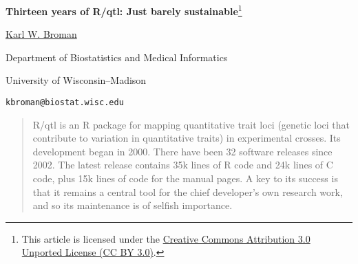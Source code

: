 \documentclass[letterpaper]{article}
\begin{document}
\renewcommand{\thefootnote}{\fnsymbol{footnote}}

\thispagestyle{empty}

\begin{center}
\large
\textbf{Thirteen years of R/qtl: Just barely
  sustainable}\footnote[0]{This article is licensed under the
  \href{http://creativecommons.org/licenses/by/3.0/}{Creative
    Commons Attribution 3.0 Unported License (CC BY 3.0)}.}

\bigskip


\href{http://www.biostat.wisc.edu/~kbroman}{Karl W. Broman}

Department of Biostatistics and Medical Informatics

University of Wisconsin--Madison

{\small \tt kbroman@biostat.wisc.edu}

\bigskip

\begin{quote}
R/qtl is an R package for mapping quantitative trait loci (genetic
loci that contribute to variation in quantitative traits) in
experimental crosses. Its development began in 2000.  There have been
32 software releases since 2002.  The latest release contains 35k lines
of R code and 24k lines of C code, plus 15k lines of code for the manual
pages.  A key to its success is
that it remains a central tool for the chief developer's own research
work, and so its maintenance is of selfish importance.
\end{quote}

\end{center}

\setlength{\columnsep}{0.5cm}
\end{document}
